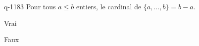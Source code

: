 \begin{truefalse}{q-1183}
Pour tous $a\leq b$ entiers, le cardinal de  $\{ a,\ldots, b\}=b-a$.
\item Vrai
\item* Faux
\end{truefalse}

